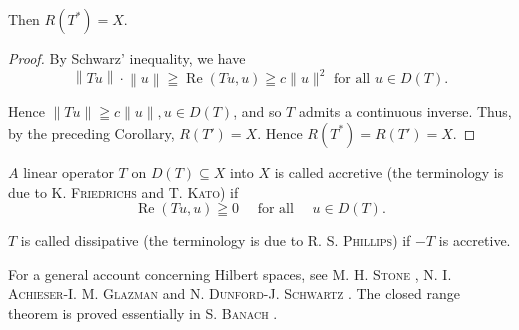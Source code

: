 Then $R(T^{*}) = X$. 

\begin{proof}
 By Schwarz' inequality, we have 
\[
\left\| T u \right\| \cdot \left\| u \right\| \geqq \operatorname{Re} (T u, u) \geqq c \| u \| ^{2} \text{ for all } u \in D (T). \]

Hence $\|Tu\| \geqq c \|u\|, u \in D(T)$, and so $T$ admits a continuous inverse. Thus, by the preceding Corollary, $R(T') = X$. Hence $R(T^*) = R(T') = X$. 
\end{proof}

\begin{remarku} $A$ linear operator $T$ on $D(T) \subseteq X$ into $X$ is called accretive (the terminology is due to K. \textsc{Friedrichs} and T. \textsc{Kato}) if 
\begin{equation}\label{eq:VII.5.8}
\operatorname{Re} (T u, u) \geqq 0 \quad \text{ for all } \quad u \in D (T).
\end{equation}
\end{remarku}

$T$ is called dissipative (the terminology is due to R. S. \textsc{Phillips}) if $-T$ is accretive. 


For a general account concerning Hilbert spaces, see M. H. \textsc{Stone} \cite{stone311}, N. I. \textsc{Achieser}-I. M. \textsc{Glazman} \cite{achieser1} and N. \textsc{Dunford}-J. \textsc{Schwartz} \cite{dunford48}. The closed range theorem is proved essentially in S. \textsc{Banach} \cite{banach9}. 
